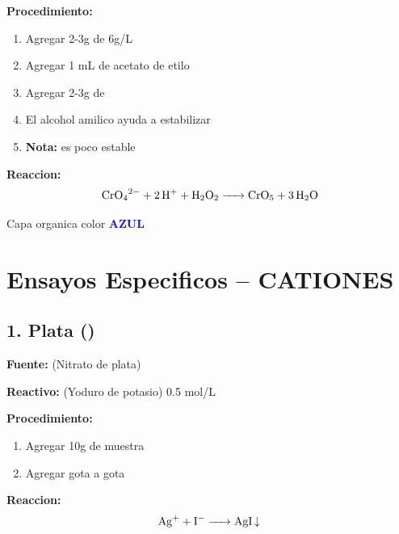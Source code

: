 \documentclass[11pt,a4paper]{article}
\begin{document}
\textbf{Procedimiento:}
\begin{enumerate}[leftmargin=*]
    \item Agregar 2-3g de  6g/L
    \item Agregar 1 mL de acetato de etilo
    \item Agregar 2-3g de 
    \item El alcohol amilico ayuda a estabilizar
    \item \textbf{Nota:}  es poco estable
\end{enumerate}

\begin{reaccionbox}
\textbf{Reaccion:}
\begin{equation*}
\ce{CrO4^{2-} + 2H^+ + H2O2 -> CrO5 + 3H2O}
\end{equation*}
\end{reaccionbox}

\begin{resultado}
Capa organica color \textbf{\textcolor{blue}{AZUL}}
\end{resultado}

\newpage

\section{Ensayos Especificos -- CATIONES}

\subsection{1. Plata ()}

\textbf{Fuente:}  (Nitrato de plata)

\textbf{Reactivo:}  (Yoduro de potasio) 0.5 mol/L

\textbf{Procedimiento:}
\begin{enumerate}[leftmargin=*]
    \item Agregar 10g de muestra
    \item Agregar  gota a gota
\end{enumerate}

\begin{reaccionbox}
\textbf{Reaccion:}
\begin{equation*}
\ce{Ag^+ + I^- -> AgI v}
\end{equation*}
\end{reaccionbox}
\end{document}
